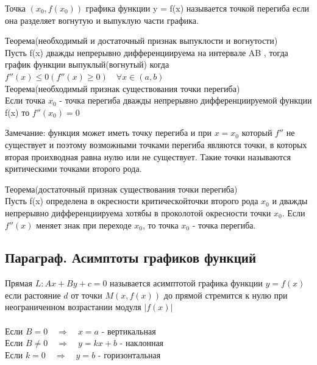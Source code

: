 \documentclass[a4paper, 12pt]{article}
\begin{document}
Точка $ (x_0,f(x_0)) $ графика функции y = f(x) называется точкой перегиба если она разделяет вогнутую и выпуклую части графика.\\  

\begin{mdframed}[backgroundcolor=blue!20] 
       Теорема(необходимый и достаточный признак выпуклости и вогнутости)\\
       Пусть f(x) дважды непрерывно дифференциируема на интервале AB , тогда график функции выпуклый(вогнутый) когда\\ $ f''(x) \leq 0(f''(x) \geq 0) \quad \forall x \in (a,b)$ \\

       Теорема(необходимый признак существования точки перегиба)\\
       Если точка $ x_0 $  - точка перегиба дважды непрерывно дифференциируемой функции f(x) то $ f''(x_0) = 0 $  
    \end{mdframed}

Замечание: функция может иметь точку перегиба и при $ x = x_0 $ который $ f'' $  не существует и поэтому возможными точками перегиба являются точки, в которых вторая проихводная равна нулю или не существует. Такие точки называются критическими точками второго рода.\\

\begin{mdframed}[backgroundcolor=blue!20] 
       Теорема(достаточный признак существования точки перегиба)\\
       Пусть f(x) определена в окресности критическойточки второго рода $ x_0 $ и дважды непрерывно дифференциируема хотябы в проколотой окресности точки $ x_0 $. Если $ f''(x) $ меняет знак при переходе $ x_0 $, то точка   $ x_0 $ - точка перегиба.   
    \end{mdframed}
\newpage
\subsection{Параграф. Асимптоты графиков функций}
Прямая $ L: Ax+By +c = 0 $ называется асимптотой графика функции $ y=f(x) $  если растояние $ d $ от точки $ M(x,f(x)) $ до прямой стремится к нулю при неограниченном возрастании модуля $ |f(x)| $  \\ \\
Если $ B = 0 \quad \Rightarrow \quad  x=a $ - вертикальная\\
Если $ B \neq 0 \quad \Rightarrow \quad  y = kx + b$ - наклонная \\
Если $ k = 0 \quad \Rightarrow \quad y=b $ - горизонтальная   \\
\end{document}
